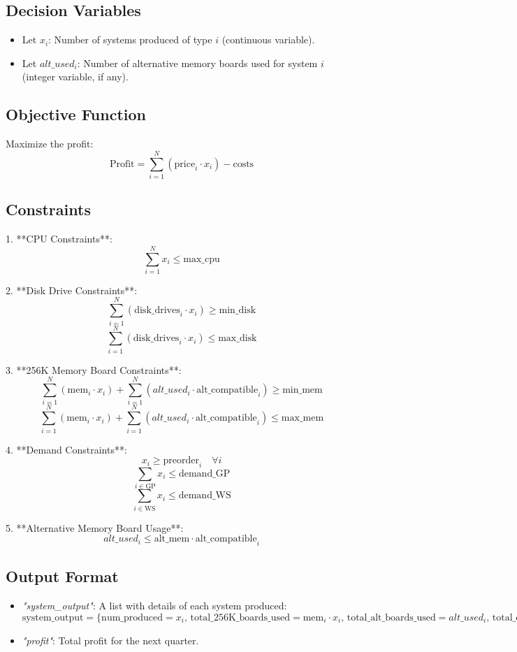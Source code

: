 \documentclass{article}
\begin{document}
\subsection*{Decision Variables}
\begin{itemize}
    \item Let \( x_i \): Number of systems produced of type \( i \) (continuous variable).
    \item Let \( alt\_used_i \): Number of alternative memory boards used for system \( i \) (integer variable, if any).
    \end{itemize}

\subsection*{Objective Function}
Maximize the profit:
\[
\text{Profit} = \sum_{i=1}^{N} (\text{price}_i \cdot x_i) - \text{costs}
\]

\subsection*{Constraints}

1. **CPU Constraints**:
\[
\sum_{i=1}^{N} x_i \leq \text{max\_cpu}
\]

2. **Disk Drive Constraints**:
\[
\sum_{i=1}^{N} (\text{disk\_drives}_i \cdot x_i) \geq \text{min\_disk}
\]
\[
\sum_{i=1}^{N} (\text{disk\_drives}_i \cdot x_i) \leq \text{max\_disk}
\]

3. **256K Memory Board Constraints**:
\[
\sum_{i=1}^{N} (\text{mem}_i \cdot x_i) + \sum_{i=1}^{N} (alt\_used_i \cdot \text{alt\_compatible}_i) \geq \text{min\_mem}
\]
\[
\sum_{i=1}^{N} (\text{mem}_i \cdot x_i) + \sum_{i=1}^{N} (alt\_used_i \cdot \text{alt\_compatible}_i) \leq \text{max\_mem}
\]

4. **Demand Constraints**:
\[
x_i \geq \text{preorder}_i \quad \forall i
\]
\[
\sum_{i \in \text{GP}} x_i \leq \text{demand\_GP}
\]
\[
\sum_{i \in \text{WS}} x_i \leq \text{demand\_WS}
\]

5. **Alternative Memory Board Usage**:
\[
alt\_used_i \leq \text{alt\_mem} \cdot \text{alt\_compatible}_i
\]

\subsection*{Output Format}
\begin{itemize}
    \item \textit{"system\_output"}: A list with details of each system produced:
    \[
    \text{system\_output} = \{ 
        \text{num\_produced} = x_i, \, 
        \text{total\_256K\_boards\_used} = \text{mem}_i \cdot x_i, \,
        \text{total\_alt\_boards\_used} = alt\_used_i, \,
        \text{total\_disk\_drives\_used} = \text{disk\_drives}_i \cdot x_i 
    \}
    \]
    \item \textit{"profit"}: Total profit for the next quarter.
\end{itemize}
\end{document}
